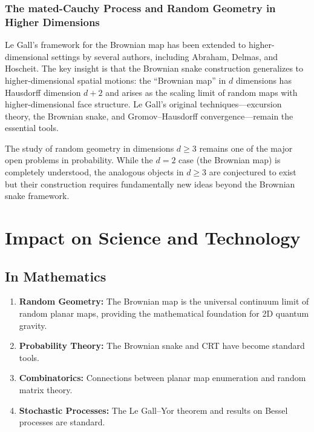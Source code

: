 \subsubsection{The mated-Cauchy Process and Random Geometry in Higher Dimensions}

Le Gall's framework for the Brownian map has been extended to higher-dimensional settings by several authors, including Abraham, Delmas, and Hoscheit. The key insight is that the Brownian snake construction generalizes to higher-dimensional spatial motions: the ``Brownian map'' in $d$ dimensions has Hausdorff dimension $d+2$ and arises as the scaling limit of random maps with higher-dimensional face structure. Le Gall's original techniques---excursion theory, the Brownian snake, and Gromov--Hausdorff convergence---remain the essential tools.

\begin{remark}
The study of random geometry in dimensions $d \geq 3$ remains one of the major open problems in probability. While the $d = 2$ case (the Brownian map) is completely understood, the analogous objects in $d \geq 3$ are conjectured to exist but their construction requires fundamentally new ideas beyond the Brownian snake framework.
\end{remark}

\section{Impact on Science and Technology}

\subsection{In Mathematics}

\begin{enumerate}
    \item \textbf{Random Geometry:} The Brownian map is the universal continuum limit of random planar maps, providing the mathematical foundation for 2D quantum gravity.
    \item \textbf{Probability Theory:} The Brownian snake and CRT have become standard tools.
    \item \textbf{Combinatorics:} Connections between planar map enumeration and random matrix theory.
    \item \textbf{Stochastic Processes:} The Le Gall--Yor theorem and results on Bessel processes are standard.
\end{enumerate}

